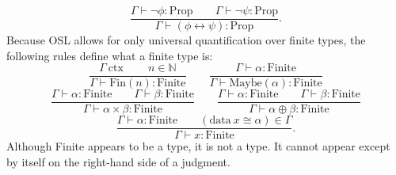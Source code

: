 \documentclass[11pt]{article}
\begin{document}
\begin{equation}
	\frac{\Gamma \vdash \neg\phi : \text{Prop}
	\qquad
	\Gamma \vdash \neg\psi : \text{Prop}}
	{\Gamma \vdash (\phi \leftrightarrow \psi) : \text{Prop}}.
\end{equation}
Because OSL allows for only universal quantification over finite types,
the following rules define what a finite type is:
\begin{equation}
	\frac{\Gamma\ \text{ctx}\ \qquad n \in \mathbb{N}}
	{\Gamma \vdash \text{Fin}(n) : \text{Finite}}
	\qquad
	\frac{\Gamma \vdash \alpha : \text{Finite}}
	{\Gamma \vdash \text{Maybe}(\alpha) : \text{Finite}}
\end{equation}
\begin{equation}
	\frac{\Gamma \vdash \alpha : \text{Finite}
	\qquad \Gamma \vdash \beta : \text{Finite}}
	{\Gamma \vdash \alpha \times \beta : \text{Finite}}
	\qquad
	\frac{\Gamma \vdash \alpha : \text{Finite}
	\qquad \Gamma \vdash \beta : \text{Finite}}
	{\Gamma \vdash \alpha \oplus \beta : \text{Finite}}
\end{equation}
\begin{equation}
	\frac{\Gamma \vdash \alpha : \text{Finite}
	\qquad (\text{data}\ x \cong \alpha) \in \Gamma}
	{\Gamma \vdash x : \text{Finite}}.
\end{equation}
Although Finite appears to be a type, it is not a type.
It cannot appear except by itself on the right-hand side
of a judgment.
\end{document}
